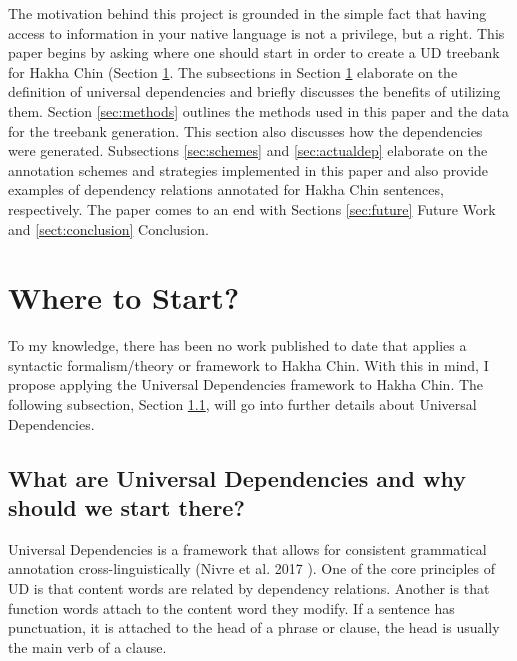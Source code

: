 \documentclass[10pt, a4paper]{article}
\begin{document}
The motivation behind this project is grounded in the simple fact that having access to information in your native language is not a privilege, but a right. 
This paper begins by asking where one should start in order to create a UD treebank for Hakha Chin (Section \ref{sec:start}. The subsections in Section \ref{sec:start} elaborate on the definition of universal dependencies and briefly discusses the benefits of utilizing them. Section \ref{sec:methods} outlines the methods used in this paper and the data for the treebank generation. This section also discusses how the dependencies were generated. Subsections \ref{sec:schemes} and \ref{sec:actualdep} elaborate on the annotation schemes and strategies implemented in this paper and also provide examples of dependency relations annotated for Hakha Chin sentences, respectively. The paper comes to an end with Sections \ref{sec:future} Future Work and \ref{sect:conclusion} Conclusion.

\section{Where to Start?}
\label{sec:start}

To my knowledge, there has been no work published to date that applies a syntactic formalism/theory or framework to Hakha Chin. With this in mind, I propose applying the Universal Dependencies framework to Hakha Chin. The following subsection, Section \ref{sec:whatUD}, will go into further details about Universal Dependencies.  

\subsection{What are Universal Dependencies and why should we start there?}
\label{sec:whatUD}

Universal Dependencies is a framework that allows for consistent grammatical annotation cross-linguistically (Nivre et al. 2017 \cite{nivre2017universal}). One of the core principles of UD is that content words are related by dependency relations. Another is that function words attach to the content word they modify. If a sentence has punctuation, it is attached to the head of a phrase or clause, the head is usually the main verb of a clause. 

\end{document}
